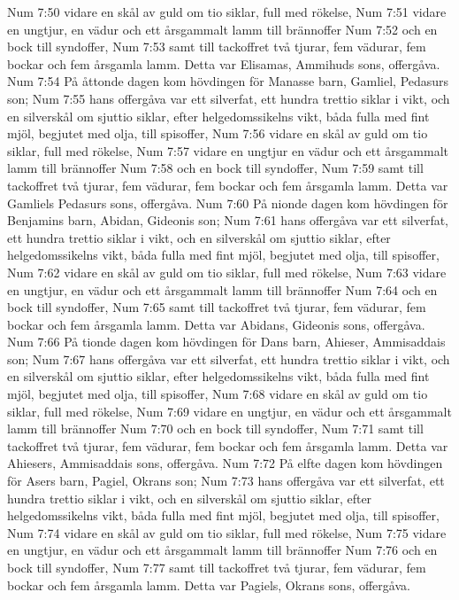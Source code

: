 Num 7:50  vidare en skål av guld om tio siklar, full med rökelse,
Num 7:51  vidare en ungtjur, en vädur och ett årsgammalt lamm till brännoffer
Num 7:52  och en bock till syndoffer,
Num 7:53  samt till tackoffret två tjurar, fem vädurar, fem bockar och fem årsgamla lamm. Detta var Elisamas, Ammihuds sons, offergåva.
Num 7:54  På åttonde dagen kom hövdingen för Manasse barn, Gamliel, Pedasurs son;
Num 7:55  hans offergåva var ett silverfat, ett hundra trettio siklar i vikt, och en silverskål om sjuttio siklar, efter helgedomssikelns vikt, båda fulla med fint mjöl, begjutet med olja, till spisoffer,
Num 7:56  vidare en skål av guld om tio siklar, full med rökelse,
Num 7:57  vidare en ungtjur en vädur och ett årsgammalt lamm till brännoffer
Num 7:58  och en bock till syndoffer,
Num 7:59  samt till tackoffret två tjurar, fem vädurar, fem bockar och fem årsgamla lamm. Detta var Gamliels Pedasurs sons, offergåva.
Num 7:60  På nionde dagen kom hövdingen för Benjamins barn, Abidan, Gideonis son;
Num 7:61  hans offergåva var ett silverfat, ett hundra trettio siklar i vikt, och en silverskål om sjuttio siklar, efter helgedomssikelns vikt, båda fulla med fint mjöl, begjutet med olja, till spisoffer,
Num 7:62  vidare en skål av guld om tio siklar, full med rökelse,
Num 7:63  vidare en ungtjur, en vädur och ett årsgammalt lamm till brännoffer
Num 7:64  och en bock till syndoffer,
Num 7:65  samt till tackoffret två tjurar, fem vädurar, fem bockar och fem årsgamla lamm. Detta var Abidans, Gideonis sons, offergåva.
Num 7:66  På tionde dagen kom hövdingen för Dans barn, Ahieser, Ammisaddais son;
Num 7:67  hans offergåva var ett silverfat, ett hundra trettio siklar i vikt, och en silverskål om sjuttio siklar, efter helgedomssikelns vikt, båda fulla med fint mjöl, begjutet med olja, till spisoffer,
Num 7:68  vidare en skål av guld om tio siklar, full med rökelse,
Num 7:69  vidare en ungtjur, en vädur och ett årsgammalt lamm till brännoffer
Num 7:70  och en bock till syndoffer,
Num 7:71  samt till tackoffret två tjurar, fem vädurar, fem bockar och fem årsgamla lamm. Detta var Ahiesers, Ammisaddais sons, offergåva.
Num 7:72  På elfte dagen kom hövdingen för Asers barn, Pagiel, Okrans son;
Num 7:73  hans offergåva var ett silverfat, ett hundra trettio siklar i vikt, och en silverskål om sjuttio siklar, efter helgedomssikelns vikt, båda fulla med fint mjöl, begjutet med olja, till spisoffer,
Num 7:74  vidare en skål av guld om tio siklar, full med rökelse,
Num 7:75  vidare en ungtjur, en vädur och ett årsgammalt lamm till brännoffer
Num 7:76  och en bock till syndoffer,
Num 7:77  samt till tackoffret två tjurar, fem vädurar, fem bockar och fem årsgamla lamm. Detta var Pagiels, Okrans sons, offergåva.
